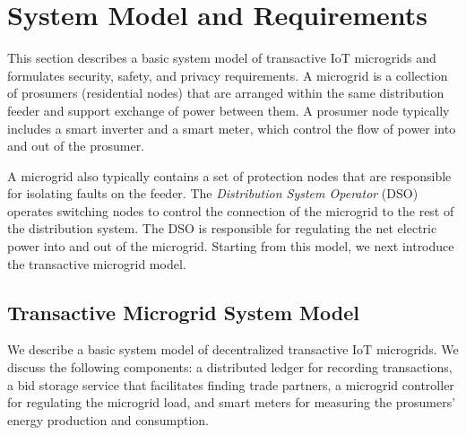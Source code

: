 \section{System Model and Requirements}

This section describes a basic system model of transactive IoT
microgrids and formulates security, safety, and privacy requirements.
A microgrid is a collection of prosumers (residential nodes) that are
arranged within the same distribution feeder and support exchange of
power between them. A prosumer node typically includes a smart
inverter and a smart meter, which control the flow of power into and
out of the prosumer. 

A microgrid also typically contains a set of protection nodes that are
responsible for isolating faults on the feeder.  The
\emph{Distribution System Operator} (DSO) operates %
switching nodes to control the connection of the microgrid to the rest
of the distribution system. The DSO is responsible for regulating the
net electric power into and out of the microgrid. Starting from this
model, we next introduce the transactive microgrid model.

\subsection{Transactive Microgrid System Model}
  We
describe a basic system model of decentralized transactive IoT
microgrids.  We discuss the following components: a distributed ledger
for recording transactions, a bid storage service that facilitates
finding trade partners, a microgrid controller for regulating the
microgrid load, and smart meters for measuring the prosumers' energy
production and consumption.

